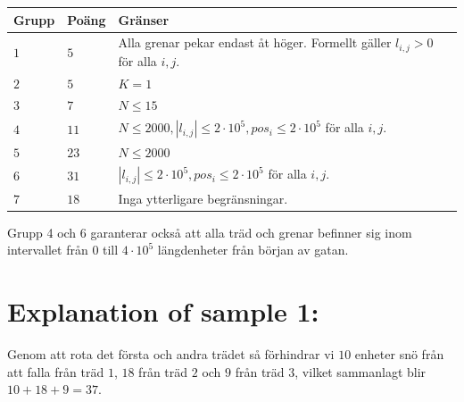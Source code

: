 \noindent
\begin{tabular}{| l | l | p{12cm} |}
  \hline
  \textbf{Grupp} & \textbf{Poäng} & \textbf{Gränser} \\ \hline
  $1$    & $5$        & Alla grenar pekar endast åt höger. Formellt gäller $l_{i,j} > 0$ för alla $i,j$.  \\ \hline
  $2$    & $5$        & $K = 1$ \\ \hline
  $3$    & $7$        & $N \leq 15$ \\ \hline
  $4$    & $11$       & $N \leq 2000, |l_{i,j}| \leq 2 \cdot 10^5, pos_i \leq 2 \cdot 10^5$ för alla $i,j$. \\ \hline %
  $5$    & $23$       & $N \leq 2000$  \\ \hline
  $6$    & $31$       & $ |l_{i,j}| \leq 2 \cdot 10^5, pos_i \leq 2 \cdot 10^5$ för alla $i,j$. \\ \hline
  $7$    & $18$       & Inga ytterligare begränsningar. \\ \hline
\end{tabular}

Grupp 4 och 6 garanterar också att alla träd och grenar befinner sig inom intervallet från $0$ till $4 \cdot 10^5$ längdenheter från början av gatan.

\section*{Explanation of sample 1:}
Genom att rota det första och andra trädet så förhindrar vi $10$ enheter snö från att falla från träd $1$, $18$ från träd $2$ och $9$ från träd $3$,
vilket sammanlagt blir $10+18+9=37$.
